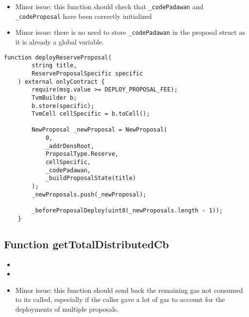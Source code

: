 \begin{itemize}
\item Minor issue: this function should check that {\tt \_codePadawan} and {\tt \_codeProposal}
  have been correctly initialized
\item Minor issue: there is no need to store {\tt \_codePadawan} in the proposal struct as it is
  already a global variable.
\end{itemize}

\begin{lstlisting}[firstnumber=112]
    function deployReserveProposal(
        string title,
        ReserveProposalSpecific specific
    ) external onlyContract {
        require(msg.value >= DEPLOY_PROPOSAL_FEE);
        TvmBuilder b;
        b.store(specific);
        TvmCell cellSpecific = b.toCell();

        NewProposal _newProposal = NewProposal(
            0,
            _addrDensRoot,
            ProposalType.Reserve,
            cellSpecific,
            _codePadawan,
            _buildProposalState(title)
        );
        _newProposals.push(_newProposal);
        
        _beforeProposalDeploy(uint8(_newProposals.length - 1));
    }
\end{lstlisting}

\subsection{Function getTotalDistributedCb}

\begin{itemize}
\item {}
\item {}
\item Minor issue: this function should send back the remaining gas
  not consumed to its called, especially if the caller gave a lot of
  gas to account for the deployments of multiple proposals.
\end{itemize}

